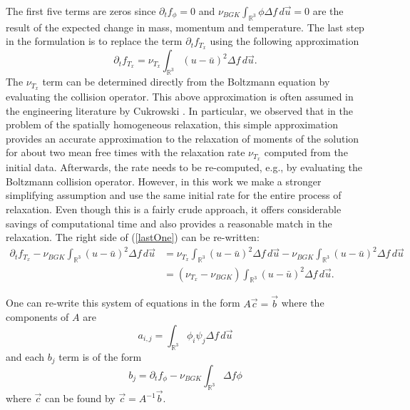 %
The first five terms are zeros since $\partial_t f_{\phi} = 0$ and $\nu_{BGK} \int_{\mathbb{R}^3} \phi \Delta f \, d\vec{u} = 0$ are the result of the expected change in mass, momentum and temperature. The last step in the formulation is to replace the term $\partial_t f_{T_x}$ using the following approximation
%
\begin{equation*}
\partial_t f_{T_x} = \nu_{T_x} \int_{\mathbb{R}^3} (u - \bar{u})^2 \Delta f \, d\vec{u}.
\end{equation*}
%
The $\nu_{T_x}$ term can be determined directly from the Boltzmann equation by evaluating the collision operator. This above approximation is often assumed in the engineering literature by Cukrowski \cite{Cuk2}.
In particular, we observed that in the problem of the spatially homogeneous relaxation, this simple approximation provides an accurate approximation to the relaxation of moments of the solution for about two mean free times with the relaxation rate $\nu_{T_{x}}$ computed from the initial data. Afterwards, the rate needs to be re-computed, e.g., by evaluating the Boltzmann collision operator. However, in this work we make a stronger simplifying assumption and use the same initial rate for the entire process of relaxation. Even though this is a fairly crude approach, it offers considerable savings of computational time and also provides a reasonable match in the relaxation. 
The right side of (\ref{lastOne}) can be re-written:
%
\begin{align*}
\partial_t f_{T_x} - \nu_{BGK} \int_{\mathbb{R}^3} (u - \bar{u})^2 \Delta f \, d\vec{u} &= \nu_{T_x} \int_{\mathbb{R}^3} (u - \bar{u})^2 \Delta f \, d\vec{u}  - \nu_{BGK} \int_{\mathbb{R}^3} (u - \bar{u})^2 \Delta f \, d\vec{u}\\
&= (\nu_{T_x} - \nu_{BGK}) \int_{\mathbb{R}^3} (u - \bar{u})^2 \Delta f \, d\vec{u}.
\end{align*}

One can re-write this system of equations in the form $A \vec{c} = \vec{b}$ where the components of $A$ are
%
\begin{equation*}
a_{i,j} = \int_{\mathbb{R}^3} \phi_i \psi_j \Delta f \, d\vec{u}
\end{equation*}
%
and each $b_j$ term is of the form
%
\begin{equation*}
b_j = \partial_t f_{\phi} - \nu_{BGK} \int_{\mathbb{R}^3} \Delta f \phi
\end{equation*}
%
where $\vec{c}$ can be found by $\vec{c} = A^{-1} \vec{b}$.

